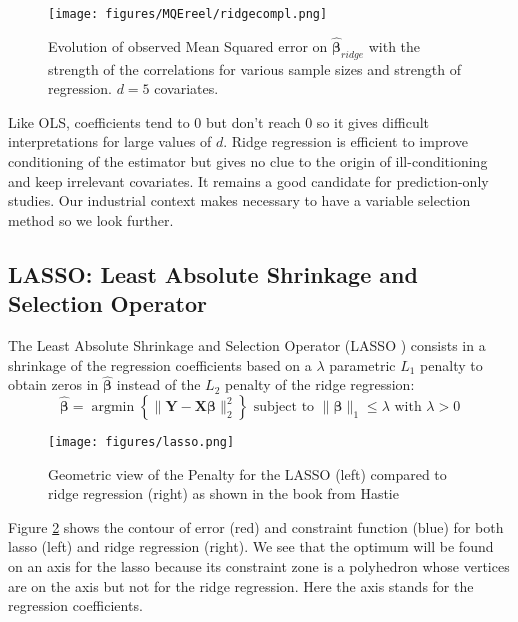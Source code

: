 \documentclass[12pt,a4paper]{report}
\begin{document}
	 \begin{figure}
	 \centering
	  \texttt{[image: figures/MQEreel/ridgecompl.png]}
	  \caption{Evolution of observed Mean Squared error on $\hat{\boldsymbol{\beta}}_{ridge}$ with the strength of the correlations for various sample sizes and strength of regression. $d=5$ covariates. } \label{MQEridgecompl}
	\end{figure}
	
	
	Like OLS, coefficients tend to 0 but don't reach 0 so it gives difficult interpretations for large values of $d$. Ridge regression is efficient to improve conditioning of the estimator but gives no clue to the origin of ill-conditioning and keep irrelevant covariates. It remains a good candidate for prediction-only studies. Our industrial context makes necessary to have a variable selection method so we look further.
	
		 \FloatBarrier
		
		\subsection{LASSO: Least Absolute Shrinkage and Selection Operator }		%

The Least Absolute Shrinkage and Selection Operator (\textsc{LASSO} \cite{tibshirani1996regression,tibshiranilasso}) consists in a shrinkage of the regression coefficients based on a $\lambda$ parametric $L_1$ penalty to obtain zeros in $\hat{\boldsymbol{\beta}}$ instead of the $L_2$ penalty of the ridge regression:
		\begin{equation}
		 \boldsymbol{\hat{\beta}}=\operatorname{argmin} \left\lbrace \parallel \boldsymbol{Y}-\boldsymbol{X\beta}\parallel_2^2 \right\rbrace \textrm{ subject to } \parallel\boldsymbol{\beta} \parallel_1\leq \lambda \textrm{ with } \lambda>0
		\end{equation}	
		
		\begin{figure}[h!]
			\centering
			\texttt{[image: figures/lasso.png]} 
			\caption{Geometric view of the Penalty for the LASSO (left) compared to ridge regression (right) as shown in the book from Hastie \cite{hastie2009elements}} \label{lassogeom}
		\end{figure}
		Figure \ref{lassogeom} shows the contour of error (red) and constraint function (blue) for both lasso (left) and ridge regression (right). We see that the optimum will be found on an axis for the lasso because its constraint zone is a polyhedron whose vertices are on the axis but not for the ridge regression. Here the axis stands for the regression coefficients.\\
		
\end{document}
